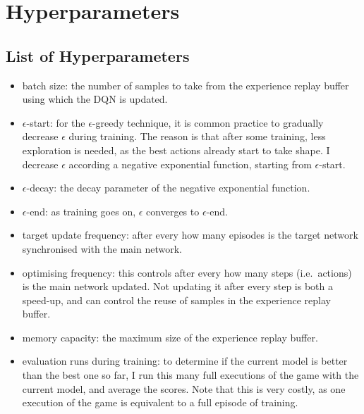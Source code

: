 
\chapter{Hyperparameters}\label{hyperparameters} 


\section*{List of Hyperparameters}


\begin{itemize} 
    \item batch size: the number of samples to take from the experience replay buffer using which the DQN is updated.
    
    \item $\epsilon$-start: for the $\epsilon$-greedy technique, it is common practice to gradually decrease $\epsilon$ during training. The reason is that after some training, less exploration is needed, as the best actions already start to take shape. I decrease $\epsilon$ according a negative exponential function, starting from $\epsilon$-start.
    
    \item $\epsilon$-decay: the decay parameter of the negative exponential function.
    
    \item $\epsilon$-end: as training goes on, $\epsilon$ converges to $\epsilon$-end.
     
    
    \item target update frequency: after every how many episodes is the target network synchronised with the main network.
    
    \item optimising frequency: this controls after every how many steps (i.e.\ actions) is the main network updated. Not updating it after every step is both a speed-up, and can control the reuse of samples in the experience replay buffer.
    
    \item memory capacity: the maximum size of the experience replay buffer.
    
    \item evaluation runs during training: to determine if the current model is better than the best one so far, I run this many full executions of the game with the current model, and average the scores. Note that this is very costly, as one execution of the game is equivalent to a full episode of training.
    

\end{itemize}
